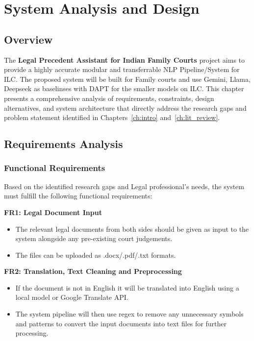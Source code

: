 \chapter{System Analysis and Design}
\label{ch:system_analysis}

\section{Overview}
The \textbf{Legal Precedent Assistant for Indian Family Courts} project aims to provide a highly accurate modular and transferrable NLP Pipeline/System for ILC. 
The proposed system will be built for Family courts and use Gemini, Llama, Deepseek as baselinses with DAPT for the smaller models on ILC. 
This chapter presents a comprehensive analysis of requirements, constraints, design alternatives, and system architecture that directly address the research gaps and problem statement identified in Chapters~\ref{ch:intro} and~\ref{ch:lit_review}.

\section{Requirements Analysis}

\subsection{Functional Requirements}
Based on the identified research gaps and Legal professional's needs, the system must fulfill the following functional requirements:

\textbf{FR1: Legal Document Input}
\begin{itemize}
    \item The relevant legal documents from both sides should be given as input to the system alongside any pre-existing court judgements.
    \item The files can be uploaded as .docx/.pdf/.txt formats.
\end{itemize}

\textbf{FR2: Translation, Text Cleaning and Preprocessing}
\begin{itemize}
    \item If the document is not in English it will be translated into English using a local model or Google Translate API. 
    \item The system pipeline will then use regex to remove any unnecessary symbols and patterns to convert the input documents into text files for further processing.
\end{itemize}

